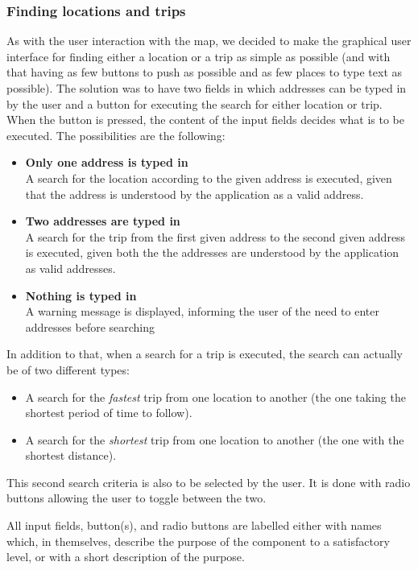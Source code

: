\subsubsection{Finding locations and trips}
As with the user interaction with the map, we decided to make the graphical user interface for finding either a location or a trip as simple as possible (and with that having as few buttons to push as possible and as few places to type text as possible). The solution was to have two fields in which addresses can be typed in by the user and a button for executing the search for either location or trip. When the button is pressed, the content of the input fields decides what is to be executed. The possibilities are the following:
\begin{itemize}
	\item \textbf{Only one address is typed in} \\
		A search for the location according to the given address is executed, given that the address is understood by the application as a valid address.
	\item \textbf{Two addresses are typed in} \\
		A search for the trip from the first given address to the second given address is executed, given both the the addresses are understood by the application as valid addresses.
	\item \textbf{Nothing is typed in} \\
		A warning message is displayed, informing the user of the need to enter addresses before searching
\end{itemize}
In addition to that, when a search for a trip is executed, the search can actually be of two different types:
\begin{itemize}
	\item A search for the \textit{fastest} trip from one location to another (the one taking the shortest period of time to follow).
	\item A search for the \textit{shortest} trip from one location to another (the one with the shortest distance).
\end{itemize}
This second search criteria is also to be selected by the user. It is done with radio buttons allowing the user to toggle between the two.

All input fields, button(s), and radio buttons are labelled either with names which, in themselves, describe the purpose of the component to a satisfactory level, or with a short description of the purpose.

